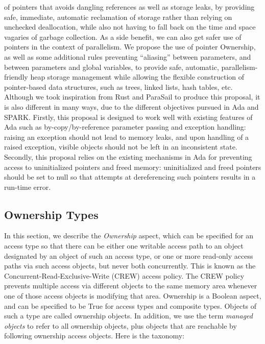\documentclass{llncs}
\begin{document}
of pointers that avoids dangling references as well as storage leaks, by providing safe, immediate, automatic reclamation of storage rather than relying on unchecked deallocation,
while also not having to fall back on the time and space vagaries of garbage collection.  As a side benefit, we can also get safer use of pointers in the context of parallelism.
We propose the use of pointer Ownership, as well as some additional rules preventing ``aliasing'' between parameters, and between parameters and global variables, to provide safe,
automatic, parallelism-friendly heap storage management while allowing the flexible construction of pointer-based data structures, such as trees, linked lists, hash tables, etc.
Although we took inspiration from Rust and ParaSail to produce this proposal, it is also different in many ways, due to the different objectives pursued in Ada and SPARK. Firstly,
this proposal is designed to work well with existing features of Ada such as by-copy/by-reference parameter passing and exception handling: raising an exception should not lead to
memory leaks, and upon handling of a raised exception, visible objects should not be left in an inconsistent state. Secondly, this proposal relies on the existing mechanisms in Ada
for preventing access to uninitialized pointers and freed memory: uninitialized and freed pointers should be set to null so that attempts at dereferencing such pointers results in a run-time error.




\subsection{Ownership Types}
\label{sec:ownership}

In this section, we describe the \textit{Ownership} aspect, which can be specified for an access type so that there can be either one writable access path to an object
designated by an object of such an access type, or one or more read-only access paths via such access objects, but never both concurrently. This is known as
the Concurrent-Read-Exclusive-Write (CREW) access policy. The CREW policy prevents multiple access via different objects to the same memory area whenever one
of those access objects is modifying that area.
Ownership is a Boolean aspect, and can be specified to be True for access types and composite types.  Objects of such a type are called ownership objects.
In addition, we use the term \textit{managed objects} to refer to all ownership objects, plus objects that are reachable by following ownership access objects.
Here is the taxonomy:
\end{document}
